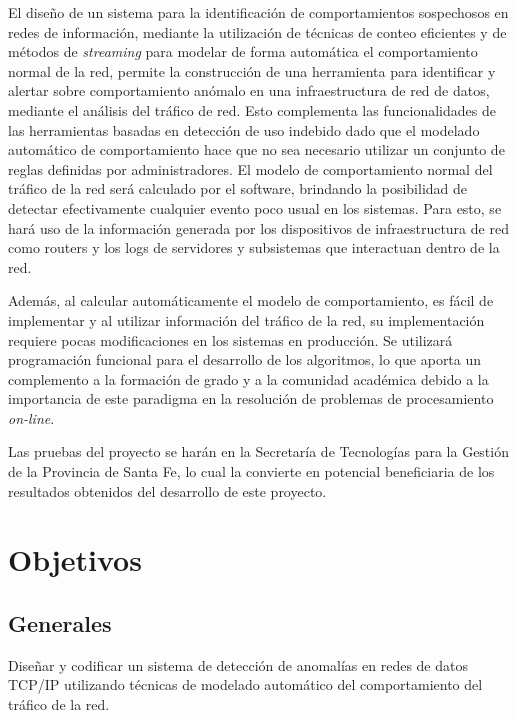 El diseño de un sistema para la identificación de comportamientos sospechosos en redes de información, mediante la utilización de técnicas de conteo eficientes y de métodos de \textit{streaming} para modelar de forma automática el comportamiento normal de la red, permite la construcción de una herramienta para identificar y alertar sobre comportamiento anómalo en una infraestructura de red de datos, mediante el análisis del tráfico de red. Esto complementa las funcionalidades de las herramientas basadas en detección de uso indebido dado que el modelado automático de comportamiento hace que no sea necesario utilizar un conjunto de reglas definidas por administradores. El modelo de comportamiento normal del tráfico de la red será calculado por el software, brindando la posibilidad de detectar efectivamente cualquier evento poco usual en los sistemas. Para esto, se hará uso de la información generada por los dispositivos de infraestructura de red como routers y los logs de servidores y subsistemas que interactuan dentro de la red. \par
Además, al calcular automáticamente el modelo de comportamiento, es fácil de implementar y al utilizar información del tráfico de la red, su implementación requiere pocas modificaciones en los sistemas en producción. Se utilizará programación funcional para el desarrollo de los algoritmos, lo que aporta un complemento a la formación de grado y a la comunidad académica debido a la importancia de este paradigma en la resolución de problemas de procesamiento \textit{on-line}. \par
Las pruebas del proyecto se harán en la Secretaría de Tecnologías para la Gestión de la Provincia de Santa Fe, lo cual la convierte en potencial beneficiaria de los resultados obtenidos del desarrollo de este proyecto.  \par

\section*{Objetivos}
\subsection*{Generales}
Diseñar y codificar un sistema de detección de anomalías en redes de datos TCP/IP utilizando técnicas de modelado automático del comportamiento del tráfico de la red.
